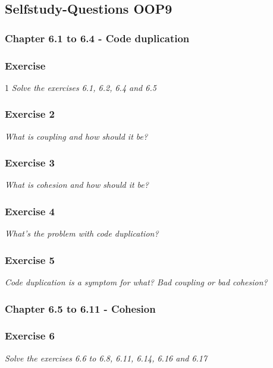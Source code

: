 \subsection{Selfstudy-Questions OOP9}

\subsubsection{Chapter 6.1 to 6.4 - Code duplication}

\subsubsection*{Exercise }1
\textit{Solve the exercises 6.1, 6.2, 6.4 and 6.5} \\

\subsubsection*{Exercise 2}
\textit{What is coupling and how should it be?} \\

\subsubsection*{Exercise 3}
\textit{What is cohesion and how should it be?} \\

\subsubsection*{Exercise 4}
\textit{What's the problem with code duplication?} \\

\subsubsection*{Exercise 5}
\textit{Code duplication is a symptom for what? Bad coupling or bad cohesion? } \\

\subsubsection{Chapter 6.5 to 6.11 - Cohesion}

\subsubsection*{Exercise 6}
\textit{Solve the exercises 6.6 to 6.8, 6.11, 6.14, 6.16 and 6.17} \\

